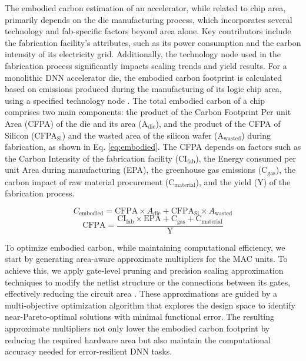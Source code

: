 The embodied carbon estimation of an accelerator, while related to chip area, primarily depends on the die manufacturing process, which incorporates several technology and fab-specific factors beyond area alone. Key contributors include the fabrication facility's attributes, such as its power consumption and the carbon intensity of its electricity grid. Additionally, the technology node used in the fabrication process significantly impacts scaling trends and yield results. For a monolithic DNN accelerator die, the embodied carbon footprint is calculated based on emissions produced during the manufacturing of its logic chip area, using a specified technology node \cite{sudarshan2024eco}. The total embodied carbon of a chip comprises two main components: the product of the Carbon Footprint Per unit Area (CFPA) of the die and its area (A$_\text{die}$), and the product of the CFPA of Silicon (CFPA$_\text{Si}$) and the wasted area of the silicon wafer (A$_\text{wasted}$) during fabrication, as shown in Eq. \ref{eq:embodied}. The CFPA depends on factors such as the Carbon Intensity of the fabrication facility (CI$_\text{fab}$), the Energy consumed per unit Area during manufacturing (EPA), the greenhouse gas emissions (C$_\text{gas}$), the carbon impact of raw material procurement (C$_\text{material}$), and the yield (Y) of the fabrication process.

\vspace{-6pt}
\begin{equation}
    C_{\text{embodied}} = \text{CFPA} \times A_{\text{die}} + \text{CFPA}_{\text{Si}} \times A_{\text{wasted}}
     \label{eq:embodied}
\end{equation}
\vspace{-6pt}
\begin{equation}
    \text{CFPA} =  \frac{\text{CI}_\text{fab} \times \text{EPA} + \text{C}_\text{gas} + \text{C}_\text{material}}{\text{Y}}
     \label{eq:cfpa}
\end{equation}

To optimize embodied carbon, while maintaining computational efficiency, we start by generating area-aware approximate multipliers for the MAC units. To achieve this, we apply gate-level pruning and precision scaling approximation techniques to modify the netlist structure or the connections between its gates, effectively reducing the circuit area \cite{9804695}. These approximations are guided by a multi-objective optimization algorithm that explores the design space to identify near-Pareto-optimal solutions with minimal functional error. The resulting approximate multipliers not only lower the embodied carbon footprint by reducing the required hardware area but also maintain the computational accuracy needed for error-resilient DNN tasks.

